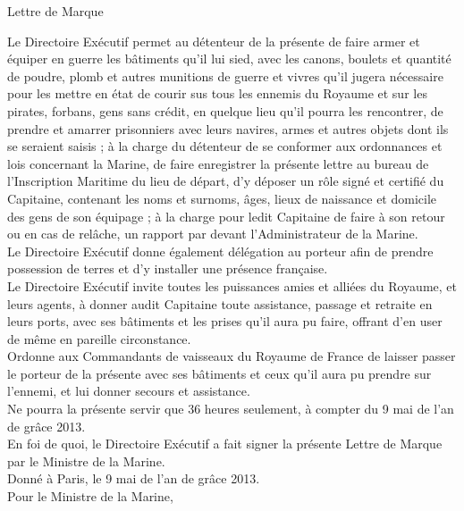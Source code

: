 {\selectfont \begin{center}\Large{Lettre de Marque}\end{center}

Le Directoire Exécutif permet au détenteur de la présente de faire
armer et équiper en guerre les bâtiments qu'il lui sied, avec les
canons, boulets et quantité de poudre, plomb et autres munitions de
guerre et vivres qu'il jugera nécessaire pour les mettre en état de
courir sus tous les ennemis du Royaume et sur les pirates, forbans,
gens sans crédit, en quelque lieu qu'il pourra les rencontrer, de
prendre et amarrer prisonniers avec leurs navires, armes et autres
objets dont ils se seraient saisis ; à la charge du détenteur de se
conformer aux ordonnances et lois concernant la Marine, de faire
enregistrer la présente lettre au bureau de l'Inscription Maritime du
lieu de départ, d'y déposer un rôle signé et certifié du Capitaine,
contenant les noms et surnoms, âges, lieux de naissance et domicile
des gens de son équipage ; à la charge pour ledit Capitaine de faire
à son retour ou en cas de relâche, un rapport par devant
l'Administrateur de la Marine.\\

Le Directoire Exécutif donne également délégation au porteur afin de
prendre possession de terres et d'y installer une présence
française.\\

Le Directoire Exécutif invite toutes les puissances amies et alliées
du Royaume, et leurs agents, à donner audit Capitaine toute
assistance, passage et retraite en leurs ports, avec ses bâtiments et
les prises qu'il aura pu faire, offrant d'en user de même en pareille
circonstance.\\

Ordonne aux Commandants de vaisseaux du Royaume de France de laisser
passer le porteur de la présente avec ses bâtiments et ceux qu'il aura
pu prendre sur l'ennemi, et lui donner secours et assistance.\\

Ne pourra la présente servir que 36 heures seulement, à compter du 9
mai de l'an de grâce 2013.\\

En foi de quoi, le Directoire Exécutif a fait signer la présente
Lettre de Marque par le Ministre de la Marine.\\

Donné à Paris, le 9 mai de l'an de grâce 2013.\\

Pour le Ministre de la Marine,}

